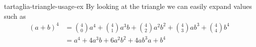 \documentclass[preview]{standalone}
\begin{document}
\begin{snippet}{tartaglia-triangle-usage-ex}
    By looking at the triangle we can easily expand values such as
    \begin{align}
        {(a+b)}^4 &= \binom{4}{0}a^4 + \binom{4}{1}a^3b + \binom{4}{2}a^2b^2+ \binom{4}{3}ab^3 + \binom{4}{4} b^4 \\
        &= a^4 + 4a^3b + 6a^2b^2 + 4ab^3a + b^4
    \end{align}
\end{snippet}
\end{document}
